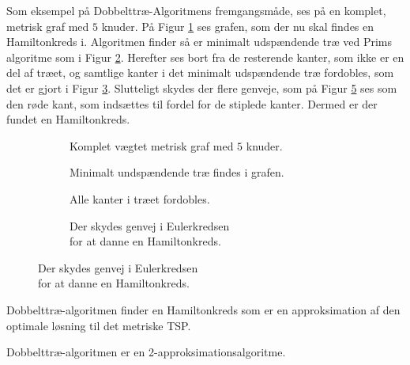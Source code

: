 \begin{exmp}
	Som eksempel på Dobbelttræ-Algoritmens fremgangsmåde, ses på en komplet, metrisk graf med $5$ knuder.
På Figur \ref{dtex1} ses grafen, som der nu skal findes en Hamiltonkreds i.
	Algoritmen finder så er minimalt udspændende træ ved Prims algoritme som i Figur \ref{dtex2}.
	Herefter ses bort fra de resterende kanter, som ikke er en del af træet, og samtlige kanter i det minimalt udspændende træ fordobles, som det er gjort i Figur \ref{dtex3}.
	Slutteligt skydes der flere genveje, som på Figur \ref{dtex4} ses som den røde kant, som indsættes til fordel for de stiplede kanter. Dermed er der fundet en Hamiltonkreds.

\begin{figure}[h]
\centering
	\begin{subfigure}{0.5\textwidth}
		\centering
			\scalebox{0.7}{}
		\label{dtex1}
		\caption{Komplet vægtet metrisk graf med $5$ knuder.}
	\end{subfigure}%
	\begin{subfigure}{0.5\textwidth}
		\centering
			\scalebox{0.7}{}
		\label{dtex2}
		\caption{Minimalt undspændende træ findes i grafen.}
	\end{subfigure}
	\newline
	\begin{subfigure}{0.5\textwidth}
		\centering		
			\scalebox{0.7}{}
		\label{dtex3}
		\caption{Alle kanter i træet fordobles.}
	\end{subfigure}%
	\begin{subfigure}{0.5\textwidth}
		\centering
			\scalebox{0.7}{}
		\label{dtex4}
		\caption{Der skydes genvej i Eulerkredsen\\ for at
		danne en Hamiltonkreds.}
	\end{subfigure}
\end{figure}
\end{exmp}

Dobbelttræ-algoritmen finder en Hamiltonkreds som er en approksimation af den optimale løsning til det metriske TSP.

\begin{thm}
Dobbelttræ-algoritmen er en 2-approksimationsalgoritme.
\end{thm}

